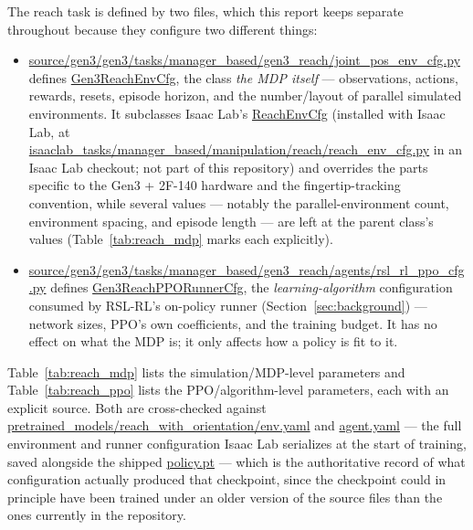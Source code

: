 \documentclass[11pt]{article}
\begin{document}
The reach task is defined by two files, which this report keeps separate throughout
because they configure two different things:
\begin{itemize}
    \item \url{source/gen3/gen3/tasks/manager_based/gen3_reach/joint_pos_env_cfg.py}
    defines \url{Gen3ReachEnvCfg}, the class \emph{the MDP itself} --- observations,
    actions, rewards, resets, episode horizon, and the number/layout of parallel
    simulated environments. It subclasses Isaac Lab's \url{ReachEnvCfg}
    (installed with Isaac Lab, at
    \url{isaaclab_tasks/manager_based/manipulation/reach/reach_env_cfg.py} in an
    Isaac Lab checkout; not part of this repository) and overrides the parts specific
    to the Gen3 + 2F-140 hardware and the fingertip-tracking convention, while several
    values --- notably the parallel-environment count, environment spacing, and
    episode length --- are left at the parent class's values (Table~\ref{tab:reach_mdp}
    marks each explicitly).
    \item \url{source/gen3/gen3/tasks/manager_based/gen3_reach/agents/rsl_rl_ppo_cfg.py}
    defines \url{Gen3ReachPPORunnerCfg}, the \emph{learning-algorithm} configuration
    consumed by RSL-RL's on-policy runner (Section~\ref{sec:background}) --- network
    sizes, PPO's own coefficients, and the training budget. It has no effect on what
    the MDP is; it only affects how a policy is fit to it.
\end{itemize}

Table~\ref{tab:reach_mdp} lists the simulation/MDP-level parameters and
Table~\ref{tab:reach_ppo} lists the PPO/algorithm-level parameters, each with an
explicit source. Both are cross-checked against
\url{pretrained_models/reach_with_orientation/env.yaml} and \url{agent.yaml}
--- the full environment and runner configuration Isaac Lab serializes at the start
of training, saved alongside the shipped \url{policy.pt} --- which is the
authoritative record of what configuration actually produced that checkpoint,
since the checkpoint could in principle have been trained under an older version of
the source files than the ones currently in the repository.
\end{document}
